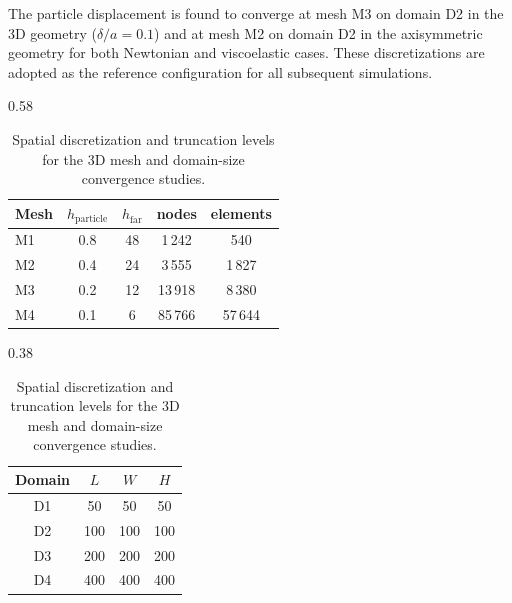\documentclass{elsarticle}
\begin{document}
The particle displacement is found to converge at mesh M3 on domain D2
in the 3D geometry ($\delta/a = 0.1$) and at mesh M2 on domain D2 in
the axisymmetric geometry for both Newtonian and viscoelastic cases.
These discretizations are adopted as the reference configuration for all
subsequent simulations.

\begin{table}[!ht]
  \centering
  \begin{subtable}[t]{0.58\textwidth}
    \centering
    \begin{tabular}{lcccc}
      \toprule
      Mesh & $h_{\mathrm{particle}}$ & $h_{\mathrm{far}}$ & nodes  & elements \\
      \midrule
      M1 & 0.8 & 48 &  1\,242 &     540 \\
      M2 & 0.4 & 24 &  3\,555 &   1\,827 \\
      M3 & 0.2 & 12 & 13\,918 &   8\,380 \\
      M4 & 0.1 &  6 & 85\,766 &  57\,644 \\
      \bottomrule
    \end{tabular}
    \caption{3D mesh hierarchy on the reference domain D2.}
  \end{subtable}\hfill
  \begin{subtable}[t]{0.38\textwidth}
    \centering
    \begin{tabular}{cccc}
      \toprule
      Domain & $L$ & $W$ & $H$ \\
      \midrule
      D1 &  50 &  50 &  50 \\
      D2 & 100 & 100 & 100 \\
      D3 & 200 & 200 & 200 \\
      D4 & 400 & 400 & 400 \\
      \bottomrule
    \end{tabular}
    \caption{Domain-size levels for the 3D geometry.}
  \end{subtable}
  \caption{Spatial discretization and truncation levels for the 3D
           mesh and domain-size convergence studies.}
  \label{tab:3d-domain}
\end{table}
\end{document}

